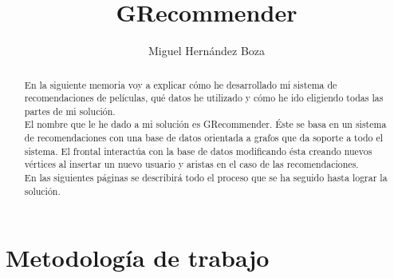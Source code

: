 \documentclass[12pt,a4paper]{article}
\author{Miguel Hernández Boza}
\title{GRecommender}
\begin{document}
	
		\maketitle
		\begin{abstract}
			
			En la siguiente memoria voy a explicar cómo he desarrollado mi sistema de recomendaciones de películas, qué datos he utilizado y cómo he ido eligiendo todas las partes de mi solución.\\
			
			El nombre que le he dado a mi solución es GRecommender. Éste se basa en un sistema de recomendaciones con una base de datos orientada a grafos que da soporte a todo el sistema. El frontal interactúa con la base de datos modificando ésta creando nuevos vértices al insertar un nuevo usuario y aristas en el caso de las recomendaciones. \\
			
			En las siguientes páginas se describirá todo el proceso que se ha seguido hasta lograr la solución.\\
			
		\end{abstract}
		\clearpage
		\tableofcontents
		\clearpage
		\listoffigures
		\clearpage
		\section{Metodología de trabajo}
		
\end{document}
